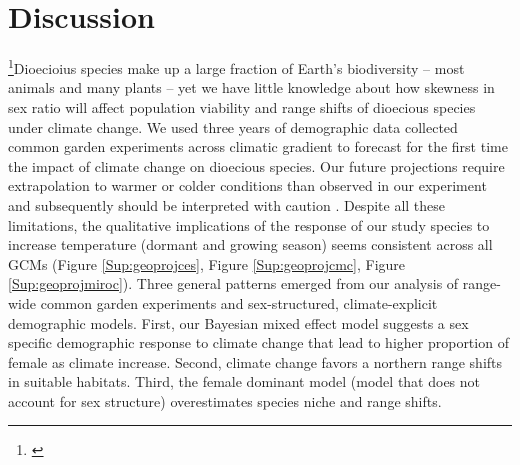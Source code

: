 \documentclass[12pt]{article}\usepackage[]{graphicx}\usepackage[dvipsnames]{xcolor}
\newcommand{\tom}[2]{{\color{red}{#1}}\footnote{\textit{\color{red}{#2}}}}
\newcommand{\jacob}[2]{{\color{blue}{#1}}\footnote{\textit{\color{blue}{#2}}}}
\begin{document}
\section*{Discussion}
\jacob{}{This is my new proposition regarding the discussion}Dioecioius species make up a large fraction of Earth's biodiversity -- most animals and many plants -- yet we have little knowledge about how skewness in sex ratio will affect population viability and range shifts of dioecious species under climate change.
We used three years of demographic data collected common garden experiments across climatic gradient to forecast for the first time the impact of climate change on dioecious species.
Our future projections require extrapolation to warmer or colder conditions than observed in our experiment and subsequently should be interpreted with caution \citep{chen2024influence}.
Despite all these limitations, the qualitative implications of the response of our study species to increase temperature (dormant and growing season) seems consistent across all GCMs (Figure \ref{Sup:geoprojces}, Figure \ref{Sup:geoprojcmc}, Figure \ref{Sup:geoprojmiroc}).  
Three general patterns emerged from our analysis of range-wide common garden experiments and sex-structured, climate-explicit demographic models.
First, our Bayesian mixed effect model suggests a sex specific demographic response to climate change that lead to higher proportion of female as climate increase.
Second, climate change favors a northern range shifts in suitable  habitats. 
Third, the female dominant model (model that does not account for sex structure) overestimates species niche and range shifts.
\end{document}
